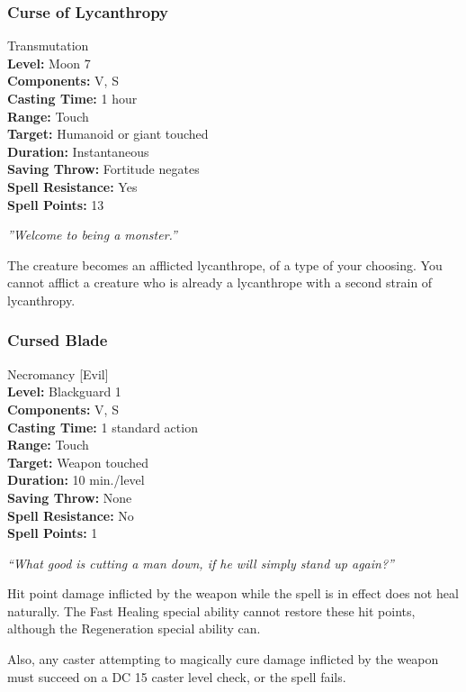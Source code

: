 \subsubsection{Curse of Lycanthropy}
\label{Spell:CurseOfLycanthropy}
Transmutation
\\ \textbf{Level:} Moon 7
\\ \textbf{Components:} V, S
\\ \textbf{Casting Time:} 1 hour
\\ \textbf{Range:} Touch
\\ \textbf{Target:} Humanoid or giant touched
\\ \textbf{Duration:} Instantaneous
\\ \textbf{Saving Throw:} Fortitude negates
\\ \textbf{Spell Resistance:} Yes
\\ \textbf{Spell Points:} 13

\emph{''Welcome to being a monster.''}

The creature becomes an afflicted lycanthrope, of a type of your choosing. You cannot afflict a creature who is already a lycanthrope with a second strain of lycanthropy.

\subsubsection{Cursed Blade}
\label{Spell:CursedBlade}
Necromancy [Evil]
\\ \textbf{Level:} Blackguard 1
\\ \textbf{Components:} V, S
\\ \textbf{Casting Time:} 1 standard action
\\ \textbf{Range:} Touch
\\ \textbf{Target:} Weapon touched
\\ \textbf{Duration:} 10 min./level
\\ \textbf{Saving Throw:} None
\\ \textbf{Spell Resistance:} No
\\ \textbf{Spell Points:} 1

\emph{``What good is cutting a man down, if he will simply stand up again?''}

Hit point damage inflicted by the weapon while the spell is in effect does not heal naturally.
The Fast Healing special ability cannot restore these hit points, although the Regeneration special ability can.

Also, any caster attempting to magically cure damage inflicted by the weapon must succeed on a DC 15 caster level check, or the spell fails.

